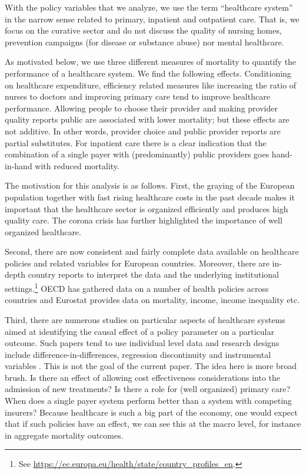 \documentclass[a4paper,12pt]{article}
\begin{document}
With the policy variables that we analyze, we use the term ``healthcare system'' in the narrow sense related to primary, inpatient and outpatient care. That is, we focus on the curative sector and do not discuss the quality of nursing homes, prevention campaigns (for disease or substance abuse) nor mental healthcare.

As motivated below, we use three different measures of mortality to quantify the performance of a healthcare system. We find the following effects. Conditioning on healthcare expenditure, efficiency related measures like increasing the ratio of nurses to doctors and improving primary care tend to improve healthcare performance. Allowing people to choose their provider and making provider quality reports public are associated with lower mortality; but these effects are not additive. In other words, provider choice and public provider reports are partial substitutes. For inpatient care there is a clear indication that the combination of a single payer with (predominantly) public providers goes hand-in-hand with reduced mortality.

The motivation for this analysis is as follows. First, the graying of the European population together with fast rising healthcare costs in the past decade makes it important that the healthcare sector is organized efficiently and produces high quality care. The corona crisis has further highlighted the importance of well organized healthcare.

Second, there are now consistent and fairly complete data available on healthcare policies and related variables for European countries.  Moreover, there are in-depth country reports to interpret the data and the underlying institutional settings.\footnote{See \url{https://ec.europa.eu/health/state/country\_profiles\_en}.} OECD has gathered data on a number of health policies across countries and Eurostat provides data on mortality, income, income inequality etc.

Third, there are numerous studies on particular aspects of healthcare systems aimed at identifying the causal effect of a policy parameter on a particular outcome. Such papers tend to use individual level data and research designs include difference-in-differences, regression discontinuity and instrumental variables \citep{econometricevaluation}. This is not the goal of the current paper. The idea here is more broad brush. Is there an effect of allowing cost effectiveness considerations into the admission of new treatments? Is there a role for (well organized) primary care? When does a single payer system perform better than a system with competing insurers? Because healthcare is such a big part of the economy, one would expect that if such policies have an effect, we can see this at the macro level, for instance in aggregate mortality outcomes.
\end{document}
